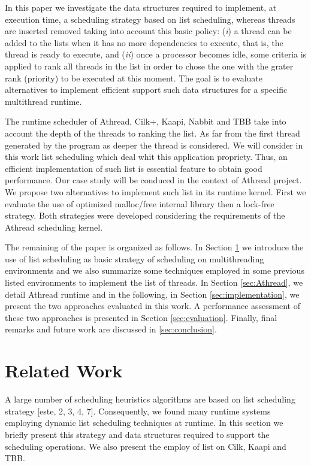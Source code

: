 \documentclass{sig-alternate}
\begin{document}
In this paper we investigate the data structures required to
implement, at execution time, a scheduling strategy based on list
scheduling, whereas threads are inserted removed taking into account
this basic policy: ({\em i}) a thread can be added to the lists when
it has no more dependencies to execute, that is, the thread is ready
to execute, and ({\em ii}) once a processor becomes idle, some
criteria is applied to rank all threads in the list in order to chose
the  one with the grater rank (priority) to be executed at this
moment. The goal is to evaluate alternatives to implement efficient
support such data structures for a specific multithread runtime.

The runtime scheduler of Athread, Cilk+, Kaapi, Nabbit and TBB take
into account the depth of the threads to ranking the list. As far from
the first thread generated by the program as deeper the thread is
considered. We will consider in this work list scheduling which deal
whit this application propriety. Thus, an efficient implementation of
such list is essential feature to obtain good performance. Our case
study will be conduced in the context of Athread project. We propose
two alternatives to implement such list in its runtime kernel. First
we evaluate the use of optimized malloc/free internal library then a
lock-free strategy. Both strategies were developed considering the
requirements of the Athread scheduling kernel.

The remaining of the paper is organized as follows. In Section
\ref{sec:related}  we introduce the use of list scheduling as basic
strategy of scheduling on multithreading environments and we also
summarize some techniques employed in some previous listed
environments to implement the list of threads.  In Section
\ref{sec:Athread}, we detail Athread runtime and in the following, in
Section \ref{sec:implementation}, we present the two approaches
evaluated in this work. A performance assessment of these two
approaches is presented in Section \ref{sec:evaluation}. Finally,
final remarks and future work are discussed in \ref{sec:conclusion}.

\section{Related Work}\label{sec:related}

A large number of scheduling heuristics algorithms are based on list
scheduling strategy [este, 2, 3, 4, 7]. Consequently, we found many
runtime systems employing dynamic list scheduling techniques at
runtime. In this section we briefly present this strategy and 
data structures required to support the scheduling
operations. We also present the employ of list on Cilk, Kaapi and TBB.
\end{document}
